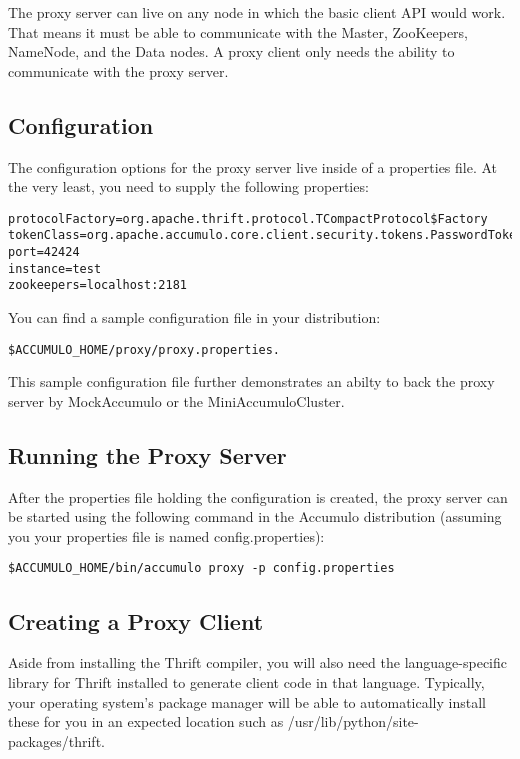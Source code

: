 The proxy server can live on any node in which the basic client API would work. That
means it must be able to communicate with the Master, ZooKeepers, NameNode, and the
Data nodes. A proxy client only needs the ability to communicate with the proxy server.


\subsection{Configuration}

The configuration options for the proxy server live inside of a properties file. At
the very least, you need to supply the following properties:

\small
\begin{verbatim}
protocolFactory=org.apache.thrift.protocol.TCompactProtocol$Factory
tokenClass=org.apache.accumulo.core.client.security.tokens.PasswordToken
port=42424
instance=test
zookeepers=localhost:2181
\end{verbatim}
\normalsize

You can find a sample configuration file in your distribution:

\small
\begin{verbatim}
$ACCUMULO_HOME/proxy/proxy.properties.
\end{verbatim}
\normalsize

This sample configuration file further demonstrates an abilty to back the proxy server
by MockAccumulo or the MiniAccumuloCluster.

\subsection{Running the Proxy Server}

After the properties file holding the configuration is created, the proxy server
can be started using the following command in the Accumulo distribution (assuming
you your properties file is named config.properties):

\small
\begin{verbatim}
$ACCUMULO_HOME/bin/accumulo proxy -p config.properties
\end{verbatim}
\normalsize

\subsection{Creating a Proxy Client}

Aside from installing the Thrift compiler, you will also need the language-specific library
for Thrift installed to generate client code in that language. Typically, your operating
system's package manager will be able to automatically install these for you in an expected
location such as /usr/lib/python/site-packages/thrift.

